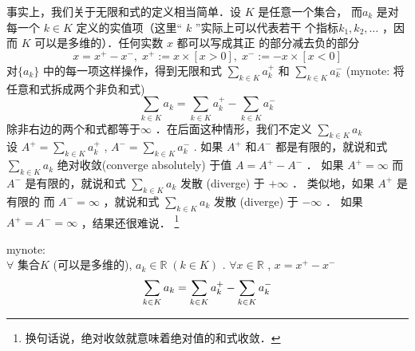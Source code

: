\documentclass[mode=geye]{elegantnote}
\newcommand\tikznode[3][]%
{\tikz[remember picture,baseline=(#2.base)]
	\node[minimum size=0pt,inner sep=0pt,#1](#2){#3};%
}
\begin{document}
事实上，我们关于无限和式的定义相当简单．设 $ K $  是任意一个集合，
而$ a_k $  是对每一个 $ k\in K $ 定义的实值项（这里“ $ k $  ”实际上可以代表若干
个指标$ k_1,k_2,\dots $  ，因而 $ K $ 可以是多维的）．任何实数 $ x $ 都可以写成其正
的部分减去负的部分
\begin{equation*}
    x=x^+-x^-,\; x^+:= x\times [x>0],\; x^- := -x\times [x<0]
\end{equation*}
对$ \{a_k\} $ 中的每一项这样操作，得到无限和式 $ \sum_{k\in K}a_k^+ $ 和 $ \sum_{k\in K}a_k^- $ (mynote: 将任意和式拆成两个非负和式)
\begin{equation}
     \sum_{k\in K}a_k =  \sum_{k\in K}a_k^+ -  \sum_{k\in K}a_k^-
\end{equation}
除非右边的两个和式都等于$ \infty $  ．在后面这种情形，我们不定义 $ \sum_{k\in K}a_k  $ \\
设 
$ A^+ = \sum_{k\in K}a_k^+  $ , 
$ A^- = \sum_{k\in K}a_k^-  $ . 
如果 $ A^+ $ 和$ A^- $ 都是有限的，就说和式 $ \sum_{k\in K}a_k  $ 绝对收敛(converge absolutely) 于值 $ A= A^+-A^- $ ．
如果 $ A^+=\infty $ 而 $ A^- $ 是有限的，就说和式 $ \sum_{k\in K}a_k  $ 发散 (diverge) 于 $ +\infty $ ．
类似地，如果 $ A^+ $ 是有限的 而 $ A^-=\infty $ ，就说和式 $ \sum_{k\in K}a_k  $ 发散 (diverge) 于 $ -\infty $ ．
如果 $ A^+ = A^-=\infty $ ，结果还很难说．
\footnote{换句话说，绝对收敛就意味着绝对值的和式收敛．}

mynote:\\
$ \forall $ 集合$ K $ (可以是多维的), $ a_k\in \mathbb{R} \;(k\in K) $ . $ \forall x\in\mathbb{R} $ , $ x = x^+-x^- $ 
\begin{equation*}
    \sum_{k\in K}a_k = \sum_{k\in K}\tikznode{ak1}{$ a_k^+ $ } - \sum_{k\in K}\tikznode{ak2}{$ a_k^- $ }
\end{equation*}

\end{document}

